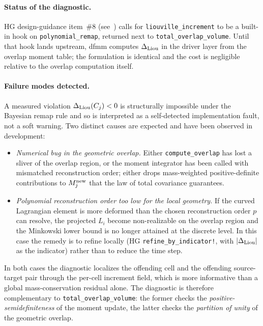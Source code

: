 \documentclass[11pt]{article}
\begin{document}
\paragraph{Status of the diagnostic.} HG design-guidance item~\#8
(see~\cite{hg-design-guidance}) calls for \texttt{liouville\_increment}
to be a built-in hook on \texttt{polynomial\_remap}, returned next
to \texttt{total\_overlap\_volume}. Until that hook lands upstream,
dfmm computes $\Delta_{\rm Liou}$ in the driver layer from the
overlap moment table; the formulation is identical and the cost is
negligible relative to the overlap computation itself.

\paragraph{Failure modes detected.} A measured violation
$\Delta_{\rm Liou}(C_j) < 0$ is structurally impossible under the
Bayesian remap rule and so is interpreted as a self-detected
implementation fault, not a soft warning. Two distinct causes are
expected and have been observed in development:
\begin{itemize}
\item \emph{Numerical bug in the geometric overlap.} Either
  \texttt{compute\_overlap} has lost a sliver of the overlap region,
  or the moment integrator has been called with mismatched
  reconstruction order; either drops mass-weighted positive-definite
  contributions to $M_j^{\rm new}$ that the law of total covariance
  guarantees.
\item \emph{Polynomial reconstruction order too low for the local
  geometry.} If the curved Lagrangian element is more deformed than
  the chosen reconstruction order $p$ can resolve, the projected
  $L_i$ become non-realizable on the overlap region and the
  Minkowski lower bound is no longer attained at the discrete level.
  In this case the remedy is to refine locally (HG
  \texttt{refine\_by\_indicator!}, with $|\Delta_{\rm Liou}|$ as
  the indicator) rather than to reduce the time step.
\end{itemize}
In both cases the diagnostic localizes the offending cell and the
offending source-target pair through the per-cell increment field,
which is more informative than a global mass-conservation residual
alone. The diagnostic is therefore complementary to
\texttt{total\_overlap\_volume}: the former checks the
\emph{positive-semidefiniteness} of the moment update, the latter
checks the \emph{partition of unity} of the geometric overlap.
\end{document}
